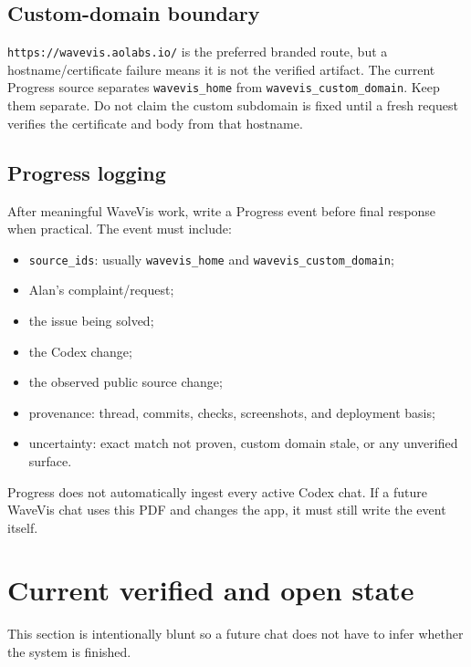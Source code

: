 \documentclass[12pt,letterpaper]{article}
\newcommand{\code}[1]{\texttt{#1}}
\begin{document}
\subsection{Custom-domain boundary}

\code{https://wavevis.aolabs.io/} is the preferred branded route, but a hostname/certificate failure means it is not the verified artifact. The current Progress source separates \code{wavevis\_home} from \code{wavevis\_custom\_domain}. Keep them separate. Do not claim the custom subdomain is fixed until a fresh request verifies the certificate and body from that hostname.

\subsection{Progress logging}

After meaningful WaveVis work, write a Progress event before final response when practical. The event must include:
\begin{itemize}
  \item \code{source\_ids}: usually \code{wavevis\_home} and \code{wavevis\_custom\_domain};
  \item Alan's complaint/request;
  \item the issue being solved;
  \item the Codex change;
  \item the observed public source change;
  \item provenance: thread, commits, checks, screenshots, and deployment basis;
  \item uncertainty: exact match not proven, custom domain stale, or any unverified surface.
\end{itemize}
Progress does not automatically ingest every active Codex chat. If a future WaveVis chat uses this PDF and changes the app, it must still write the event itself.

\section{Current verified and open state}

This section is intentionally blunt so a future chat does not have to infer whether the system is finished.
\end{document}
